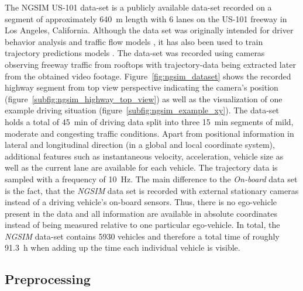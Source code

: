 The \ac{NGSIM} US-101 data-set \cite{NGSIM-US101} is a publicly available data-set recorded on a segment of approximately \SI{640}{\meter} length with \num{6} lanes on the US-101 freeway in Los Angeles, California.
Although the data set was originally intended for driver behavior analysis and traffic flow models \cite{He2017}, it has also been used to train trajectory predictions models \cite{Altche2018, Deo2018}.
The data-set was recorded using cameras observing freeway traffic from rooftops with trajectory-data being extracted later from the obtained video footage.
Figure~\ref{fig:ngsim_dataset} shows the recorded highway segment from top view perspective indicating the camera's position (figure~\ref{subfig:ngsim_highway_top_view}) as well as the visualization of one example driving situation (figure~\ref{subfig:ngsim_example_xy}).
The data-set holds a total of \SI{45}{\minute} of driving data split into three \SI{15}{\minute} segments of mild, moderate and congesting traffic conditions.
Apart from positional information in lateral and longitudinal direction (in a global and local coordinate system), additional features such as instantaneous velocity, acceleration, vehicle size as well as the current lane are available for each vehicle.
The trajectory data is sampled with a frequency of \SI{10}{\hertz}.
The main difference to the \emph{On-board} data set is the fact, that the \emph{\ac{NGSIM}} data set is recorded with external stationary cameras instead of a driving vehicle's on-board sensors.
Thus, there is no ego-vehicle present in the data and all information are available in absolute coordinates instead of being measured relative to one particular ego-vehicle.
In total, the \emph{\ac{NGSIM}} data-set contains \num{5930} vehicles and therefore a total time of roughly \SI{91.3}{\hour} when adding up the time each individual vehicle is visible.

\subsection{Preprocessing}
\label{subsec:preproc}

